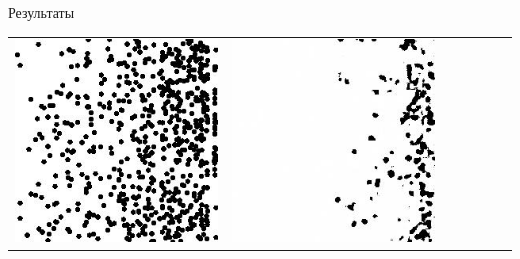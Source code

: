 \documentclass[12pt]{beamer}
\begin{document}
\begin{frame}{Результаты}
\begin{table}
\begin{center}
\begin{tabular}{p{1.2cm} p{1.2cm} p{1.2cm} p{1.2cm} p{1.2cm} p{1.2cm} p{1.2cm}}
					\includegraphics[width=1\linewidth]{8-results/sand-trend2/pan3}
					&
					\includegraphics[width=1\linewidth]{8-results/sand-trend2/nf8/gen3}
					&

\end{tabular}
\end{center}
\end{table}
\end{frame}
\end{document}
